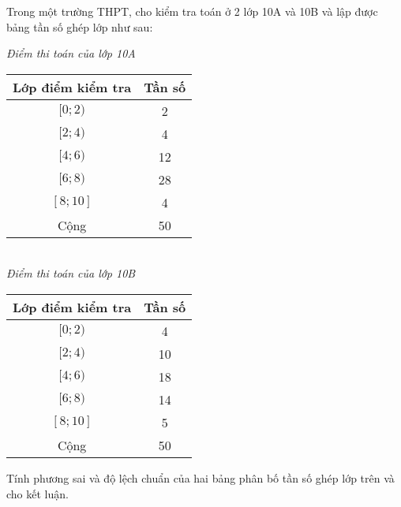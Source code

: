 \begin{bt}%
	Trong một trường THPT, cho kiểm tra toán ở 2 lớp 10A và 10B và lập được bảng tần số ghép lớp như sau:
	\begin{center}
		\emph{Điểm thi toán của lớp 10A}\\
		\begin{tabular}{|c|c|}
			\hline
			Lớp điểm kiểm tra & Tần số\\\hline
			$[0;2)$ & 2\\
			$[2;4)$ & 4\\
			$[4;6)$ & 12\\
			$[6;8)$ &28 \\
			$[8;10]$ & 4\\\hline
			Cộng & 50\\\hline
		\end{tabular}\\
		\emph{Điểm thi toán của lớp 10B}\\
		\begin{tabular}{|c|c|}
			\hline
			Lớp điểm kiểm tra & Tần số\\\hline
			$[0;2)$ & 4\\
			$[2;4)$ & 10\\
			$[4;6)$ & 18\\
			$[6;8)$ & 14 \\
			$[8;10]$ & 5\\\hline
			Cộng & 50\\\hline
		\end{tabular}
	\end{center}
	Tính phương sai và độ lệch chuẩn của hai bảng phân bố tần số ghép lớp trên và cho kết luận.
\end{bt}
